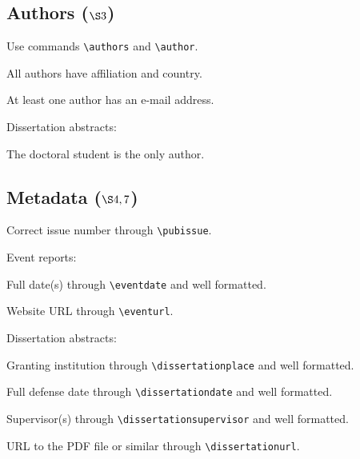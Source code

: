 \documentclass[news]{sigirforum}
\begin{document}
\subsection*{Authors ($\S3$)}

\begin{checklist}
\item Use commands \texttt{\textbackslash authors} and \texttt{\textbackslash author}.
\item All authors have affiliation and country.
\item At least one author has an e-mail address.
\item Dissertation abstracts:
	\begin{checklist}
	\item The doctoral student is the only author.
	\end{checklist}
\end{checklist}

\subsection*{Metadata ($\S4,7$)}

\begin{checklist}
\item Correct issue number through \texttt{\textbackslash pubissue}.
\item Event reports:
	\begin{checklist}
	\item Full date(s) through \texttt{\textbackslash eventdate} and well formatted.
	\item Website URL through  \texttt{\textbackslash eventurl}.
	\end{checklist}
\item Dissertation abstracts:
	\begin{checklist}
	\item Granting institution through \texttt{\textbackslash dissertationplace} and well formatted.
	\item Full defense date through \texttt{\textbackslash dissertationdate} and well formatted.
	\item Supervisor(s) through \texttt{\textbackslash dissertationsupervisor} and well formatted.
	\item URL to the PDF file or similar through \texttt{\textbackslash dissertationurl}.
	\end{checklist}
\end{checklist}
\end{document}
